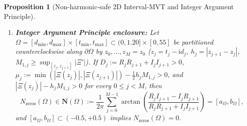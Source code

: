 \documentclass[11pt,a4paper,reqno]{amsart}
\newtheorem{proposition}[theorem]{Proposition}
\theoremstyle{definition}
\theoremstyle{remark}
\numberwithin{equation}{section}
\newcommand{\ii}{\mathrm{i}}
\newcommand{\Wtil}{\widetilde{W}}
\begin{document}
\begin{proposition}[Non-harmonic-safe 2D Interval-MVT and Integer Argument Principle]
\begin{enumerate}
\begin{equation}\label{eq:2d_mvt_prop}
\Wtil(d,t) \in \Wtil(\mathbf{B}) := \Wtil(d_0, t_0) + \frac{\partial \Wtil}{\partial d}(\mathbf{B})\cdot[-\Delta d, +\Delta d] + \frac{\partial \Wtil}{\partial t}(\mathbf{B})\cdot[-\Delta t, +\Delta t].
\end{equation}
\item[\textup{(b)}] \textbf{Integer Argument Principle enclosure:} Let $\Omega = [d_{\min}, d_{\max}] \times [t_{\min}, t_{\max}] \subset (0, 1.20] \times [0, 55]$ be partitioned counterclockwise along $\partial\Omega$ by $z_0, \dots, z_M = z_0$ ($z_j = t_j - \ii d_j$, $h_j = |z_{j+1}-z_j|$, $M_{1,j} \ge \sup_{[z_j,z_{j+1}]}|\Xi'|$). If $D_j := R_j R_{j+1} + I_j I_{j+1} > 0$, $\mu_j := \min(|\Xi(z_j)|,|\Xi(z_{j+1})|) - \frac{1}{2}h_j M_{1,j} > 0$, and $|\Xi(z_j)| - h_j M_{1,j} > 0$ for every $0 \le j < M$, then
\begin{equation}\label{eq:winding_sum}
N_{\mathrm{zeros}}(\Omega) \in \mathbf{N}(\Omega) := \frac{1}{2\pi}\sum_{j=0}^{M-1}\arctan\!\left(\frac{R_j I_{j+1} - I_j R_{j+1}}{R_j R_{j+1} + I_j I_{j+1}}\right) = [a_\Omega, b_\Omega],
\end{equation}
and $[a_\Omega, b_\Omega] \subset (-0.5, +0.5)$ implies $N_{\mathrm{zeros}}(\Omega) = 0$.
\end{enumerate}
\end{proposition}
\end{document}
